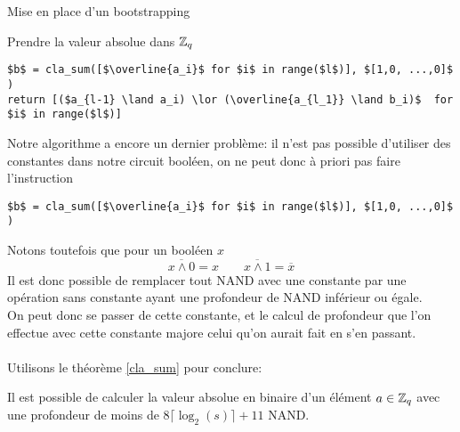 \begin{section}{Mise en place d'un bootstrapping}
\begin{subsection}{Prendre la valeur absolue dans $\mathbb{Z}_q$}
\vspace{0.3cm}
\begin{lstlisting}
$b$ = cla_sum([$\overline{a_i}$ for $i$ in range($l$)], $[1,0, ...,0]$ )
return [($a_{l-1} \land a_i) \lor (\overline{a_{l_1}} \land b_i)$  for $i$ in range($l$)]
\end{lstlisting}
\vspace{0.3cm}

Notre algorithme a encore un dernier problème: il n'est pas possible d'utiliser des constantes
dans notre circuit booléen, on ne peut donc à priori pas faire l'instruction

\vspace{0.3cm}
\begin{lstlisting}
$b$ = cla_sum([$\overline{a_i}$ for $i$ in range($l$)], $[1,0, ...,0]$ )
\end{lstlisting}
\vspace{0.3cm}
Notons toutefois que pour un booléen $x$
\[\overline{x \wedge 0 } = x \qquad \overline{x \wedge 1 } = \overline{x}\]
Il est donc possible de remplacer tout NAND avec une  constante par une opération sans constante
ayant une profondeur de NAND inférieur ou égale. \\
On peut donc se passer de cette constante, et le calcul de profondeur que l'on effectue avec cette constante
majore celui qu'on aurait fait en s'en passant.

\paragraph{}
Utilisons le théorème \ref{cla_sum} pour conclure:
\begin{prop}
Il est possible de calculer la valeur absolue en binaire d'un élément $a\in \mathbb{Z}_q$ avec une profondeur de moins de
$8\lceil \log_2(s) \rceil + 11$ NAND.
\end{prop}
\end{subsection}


\end{section}
